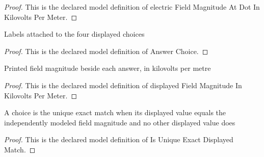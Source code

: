 \begin{proof}
  This is the declared model definition of electric Field Magnitude At Dot In Kilovolts Per Meter.
\end{proof}
\begin{definition}
  \label{def:physics:phyx-mini-0871:phyxminiproblems-problemphyxmini0871-answerchoice}
  Labels attached to the four displayed choices
\end{definition}
\begin{proof}
  This is the declared model definition of Answer Choice.
\end{proof}
\begin{definition}
  \label{def:physics:phyx-mini-0871:phyxminiproblems-problemphyxmini0871-displayedfieldmagnitudeinkilovoltspermeter}
  Printed field magnitude beside each answer, in kilovolts per metre
\end{definition}
\begin{proof}
  This is the declared model definition of displayed Field Magnitude In Kilovolts Per Meter.
\end{proof}
\begin{definition}
  \label{def:physics:phyx-mini-0871:phyxminiproblems-problemphyxmini0871-isuniqueexactdisplayedmatch}
  A choice is the unique exact match when its displayed value equals the independently modeled field magnitude and no other displayed value does
\end{definition}
\begin{proof}
  This is the declared model definition of Is Unique Exact Displayed Match.
\end{proof}
